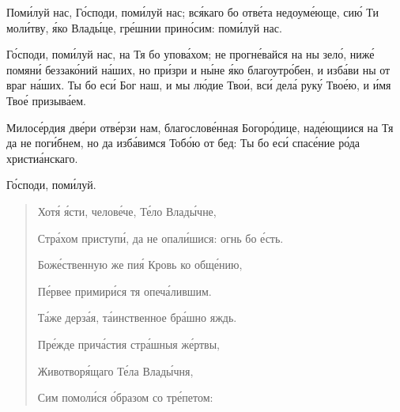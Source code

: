 \begin{mymulticols}
Пом\'{и}луй нас, Г\'{о}споди, пом\'{и}луй нас; вс\'{я}каго бо отв\'{е}та недоум\'{е}юще, си\'{ю} Ти мол\'{и}тву, \'{я}ко Влад\'{ы}це, гр\'{е}шнии прин\'{о}сим: пом\'{и}луй нас.

\slava

Г\'{о}споди, пом\'{и}луй нас, на Тя бо упов\'{а}хом; не прогн\'{е}вайся на ны зел\'{о}, ниж\'{е} помян\'{и} беззак\'{о}ний н\'{а}ших, но пр\'{и}зри и н\'{ы}не \'{я}ко благоутр\'{о}бен, и изб\'{а}ви ны от враг н\'{а}ших. Ты бо ес\'{и} Бог наш, и мы л\'{ю}дие Тво\'{и}, вс\'{и} дел\'{а} рук\'{у} Тво\'{е}ю, и \'{и}мя Тво\'{е} призыв\'{а}ем.

\inyne

Милос\'{е}рдия дв\'{е}ри отв\'{е}рзи нам, благослов\'{е}нная Богор\'{о}дице, над\'{е}ющиися на Тя да не пог\'{и}бнем, но да изб\'{а}вимся Тоб\'{о}ю от бед: Ты бо ес\'{и} спас\'{е}ние р\'{о}да христи\'{а}нскаго.

Г\'{о}споди, пом\'{и}луй. 


\begin{verse}
Хот\'{я} \'{я}сти, челов\'{е}че, Т\'{е}ло Влад\'{ы}чне,

Стр\'{а}хом приступ\'{и}, да не опал\'{и}шися: огнь бо \'{е}сть.

Бож\'{е}ственную же пи\'{я} Кровь ко общ\'{е}нию,

П\'{е}рвее примир\'{и}ся тя опеч\'{а}лившим.

Т\'{а}же дерз\'{а}я, т\'{а}инственное бр\'{а}шно яждь.

Пр\'{е}жде прич\'{а}стия стр\'{а}шныя ж\'{е}ртвы,

Животвор\'{я}щаго Т\'{е}ла Влад\'{ы}чня,

Сим помол\'{и}ся \'{о}бразом со тр\'{е}петом:
\end{verse}



\end{mymulticols}
